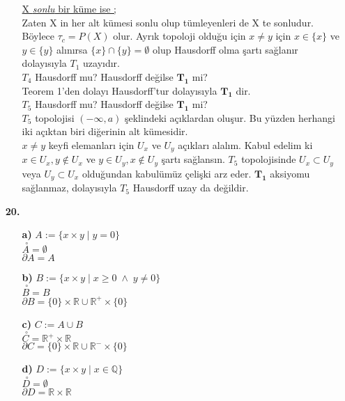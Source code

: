 \documentclass[10pt,a4paper]{article}
\theoremstyle{definition} \newtheorem{teo}{Teorem}
\begin{document}
\begin{enumerate}
\begin{enumerate}
\underline{X \textit{sonlu} bir küme ise ;}\\
Zaten X in her alt kümesi sonlu olup tümleyenleri de X te sonludur. Böylece $\tau_{c}= P(X)$ olur. Ayrık topoloji olduğu için $x\neq y$ için $x\in \{x\}$ ve $y\in \{y\}$ alınırsa $\{x\}\cap \{y\}=\emptyset$ olup Hausdorff olma şartı sağlanır dolayısıyla $T_{1}$ uzayıdır.\\


$T_{4}$ Hausdorff mu? Hausdorff değilse $\mathbf{T_{1}}$ mi?\\
Teorem 1'den dolayı Hausdorff'tur dolayısıyla $\mathbf{T_{1}}$ dir.\\


$T_{5}$ Hausdorff mu? Hausdorff değilse $\mathbf{T_{1}}$ mi?\\
$T_{5}$ topolojisi $(-\infty, a)$ şeklindeki açıklardan oluşur. Bu yüzden herhangi iki açıktan biri diğerinin alt kümesidir. \\
$x\neq y$ keyfi elemanları için $U_{x}$ ve $U_{y}$ açıkları alalım. Kabul edelim ki $x\in U_{x}, y\notin U_{x}$ ve $y\in U_{y}, x\notin U_{y}$ şartı sağlansın. $T_{5}$ topolojisinde $U_{x}\subset U_{y}$ veya $U_{y}\subset U_{x}$ olduğundan kabulümüz çelişki arz eder. $\mathbf{T_{1}}$ aksiyomu sağlanmaz, dolayısıyla $T_{5}$ Hausdorff uzay da değildir.
\end{enumerate}

\item[\textbf{20.}]

\begin{enumerate}
\item[\textbf{a)}]
$ A:= \{x\times y \mid y=0 \}$\\
$ \stackrel{\;\circ}{A}=\emptyset $\\
$ \partial A=A$

\item[\textbf{b)}]
$ B:= \{x\times y \mid x\geq 0\; \wedge \; y\neq 0\}$\\
$ \stackrel{\;\circ}{B}=B$\\
$ \partial B=\{0\}\times \mathbb{R} \cup \mathbb{R}^{+} \times \{0\} $

\item[\textbf{c)}]
$ C:= A\cup B$\\
$ \stackrel{\;\circ}{C}=\mathbb{R^{+}}\times \mathbb{R}$\\
$ \partial C=\{0\}\times\mathbb{R}\cup \mathbb{R^{-}}\times \{0\} $

\item[\textbf{d)}]
$ D:= \{x \times y \mid x \in \mathbb{Q} \}$\\
$ \stackrel{\;\circ}{D}= \emptyset$\\
$ \partial D=\mathbb{R}\times \mathbb{R} $


\end{enumerate}
\end{enumerate}
\end{document}
